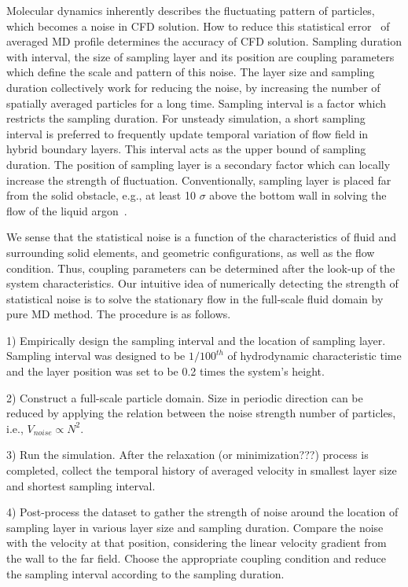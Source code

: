 \documentclass[preprint,12pt]{elsarticle}
\begin{document}
Molecular dynamics inherently describes the fluctuating pattern of particles, which becomes a noise in CFD solution. How to reduce this statistical error~\cite{Hadjicon3,Time_Mechanism} of averaged MD profile determines the accuracy of CFD solution. Sampling duration with interval, the size of sampling layer and its position are coupling parameters which define the scale and pattern of this noise. The layer size and sampling duration collectively work for reducing the noise, by increasing the number of spatially averaged particles for a long time. Sampling interval is a factor which restricts the sampling duration.  For unsteady simulation, a short sampling interval is preferred to frequently update temporal variation of flow field in hybrid boundary layers. This interval acts as the upper bound of sampling duration. The position of sampling layer is a secondary factor which can locally increase the strength of fluctuation. Conventionally, sampling layer is placed far from the solid obstacle, e.g., at least 10 $\sigma$ above the bottom wall in solving the flow of the liquid argon~\cite{Yen}.

We sense that the statistical noise is a function of the characteristics of fluid and surrounding solid elements, and geometric configurations, as well as the flow condition. Thus, coupling parameters can be determined after the look-up of the system characteristics. Our intuitive idea of numerically detecting the strength of statistical noise is to solve the stationary flow in the full-scale fluid domain by pure MD method. The procedure is as follows. 
\newline

1) Empirically design the sampling interval and the location of sampling layer. Sampling interval was designed to be $1/100^{th}$ of hydrodynamic characteristic time and the layer position was set to be 0.2 times the system's height.

2) Construct a full-scale particle domain. Size in periodic direction can be reduced by applying the relation between the noise strength number of particles, i.e., $V_{noise} \propto N^2$.

3) Run the simulation. After the relaxation (or minimization???) process is completed, collect the temporal history of averaged velocity in smallest layer size and shortest sampling interval. 

4) Post-process the dataset to gather the strength of noise around the location of sampling layer in various layer size and sampling duration. Compare the noise with the velocity at that position, considering the linear velocity gradient from the wall to the far field. Choose the appropriate coupling condition and reduce the sampling interval according to the sampling duration.
\end{document}
